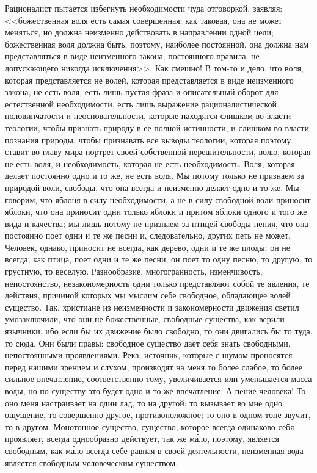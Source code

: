 \documentclass[12pt]{article}
\begin{document}
Рационалист пытается избегнуть необходимости чуда отговоркой, заявляя: <<божественная воля есть самая совершенная; как таковая, она не может меняться, но должна неизменно действовать в направлении одной цели; божественная воля должна быть, поэтому, наиболее постоянной, она должна нам представляться в виде неизменного закона, постоянного правила, не допускающего никогда исключения>>. Как смешно! В том-то и дело, что воля, которая представляется не волей, которая представляется в виде неизменного закона, не есть воля, есть лишь пустая фраза и описательный оборот для естественной необходимости, есть лишь выражение рационалистической половинчатости и неосновательности, которые находятся слишком во власти теологии, чтобы признать природу в ее полной истинности, и слишком во власти познания природы, чтобы признавать все выводы теологии, которая поэтому ставит во главу мира портрет своей собственной нерешительности, волю, которая не есть воля, и необходимость, которая не есть необходимость. Воля, которая делает постоянно одно и то же, не есть воля. Мы потому только не признаем за природой воли, свободы, что она всегда и неизменно делает одно и то же. Мы говорим, что яблоня в силу необходимости, а не в силу свободной воли приносит яблоки, что она приносит одни только яблоки и притом яблоки одного и того же вида и качества; мы лишь потому не признаем за птицей свободы пения, что она постоянно поет одни и те же песни и, следовательно, других петь не может. Человек, однако, приносит не всегда, как дерево, одни и те же плоды; он не всегда, как птица, поет одни и те же песни; он поет то одну песню, то другую, то грустную, то веселую. Разнообразие, многогранность, изменчивость, непостоянство, незакономерность одни только представляют собой те явления, те действия, причиной которых мы мыслим себе свободное, обладающее волей существо. Так, христиане из неизменности и закономерности движения светил умозаключили, что они не божественные, свободные существа, как верили язычники, ибо если бы их движение было свободно, то они двигались бы то туда, то сюда. Они были правы: свободное существо дает себя знать свободными, непостоянными проявлениями. Река, источник, которые с шумом проносятся перед нашими зрением и слухом, производят на меня то более слабое, то более сильное впечатление, соответственно тому, увеличивается или уменьшается масса воды, но по существу это будет одно и то же впечатление. А пение человека! То оно меня настраивает на один лад, то на другой; то вызывает во мне одно ощущение, то совершенно другое, противоположное; то оно в одном тоне звучит, то в другом. Монотонное существо, существо, которое всегда одинаково себя проявляет, всегда однообразно действует, так же м\'{а}ло, поэтому, является свободным, как м\'{а}ло всегда себе равная в своей деятельности, неизменная вода является свободным человеческим существом. 
\end{document}
